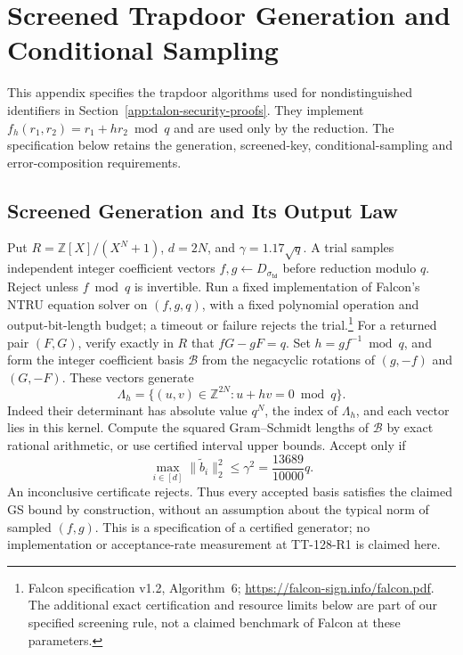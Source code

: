 \documentclass[lettersize,journal]{IEEEtran}
\begin{document}
\section{Screened Trapdoor Generation and Conditional Sampling}
\label{app:screened-trapdoor-contract}

This appendix specifies the trapdoor algorithms used for nondistinguished
identifiers in Section~\ref{app:talon-security-proofs}.
They implement $f_h(r_1,r_2)=r_1+hr_2\bmod q$ and are used only by
the reduction. The specification below retains the generation, screened-key,
conditional-sampling and error-composition requirements.

\subsection{Screened Generation and Its Output Law}
\label{par:blue-screened-generation}
Put $R=\mathbb Z[X]/(X^N+1)$, $d=2N$, and $\gamma=1.17\sqrt q$.
A trial samples independent integer coefficient vectors
$f,g\leftarrow D_{\sigma_{\mathsf{td}}}$ before reduction modulo $q$.
Reject unless $f\bmod q$ is invertible. Run a fixed implementation of
Falcon's NTRU equation solver on $(f,g,q)$, with a fixed polynomial
operation and output-bit-length budget; a timeout or failure rejects
the trial.\footnote{Falcon specification v1.2, Algorithm~6;
\url{https://falcon-sign.info/falcon.pdf}. The additional exact
certification and resource limits below are part of our specified
screening rule, not a claimed benchmark of Falcon at these parameters.}
For a returned pair $(F,G)$, verify exactly in $R$ that $fG-gF=q$.
Set $h=gf^{-1}\bmod q$, and form the integer coefficient basis
$\mathcal B$ from the negacyclic rotations of $(g,-f)$ and $(G,-F)$.
These vectors generate
\[
\Lambda_h=\{(u,v)\in\mathbb Z^{2N}:u+hv=0\bmod q\}.
\]
Indeed their determinant has absolute value $q^N$, the index of
$\Lambda_h$, and each vector lies in this kernel. Compute the squared
Gram--Schmidt lengths of $\mathcal B$ by exact rational arithmetic,
or use certified interval upper bounds. Accept only if
\[
\max_{i\in[d]}\|\widetilde b_i\|_2^2
\leq \gamma^2=\frac{13689}{10000}q.
\]
An inconclusive certificate rejects. Thus every accepted basis satisfies
the claimed GS bound by construction, without an assumption about the
typical norm of sampled $(f,g)$. This is a specification of a certified
generator; no implementation or acceptance-rate measurement at
TT-128-R1 is claimed here.
\end{document}
